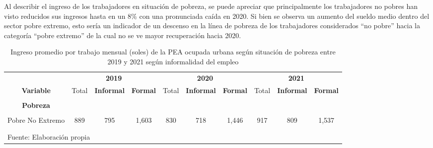 \documentclass[
  letterpaper,
  12pt,
  oneside,
  spanish,
  doublespacing,
  headsepline,
  parskip]{MastersDoctoralThesis}
\begin{document}
Al describir el ingreso de los trabajadores en situación de pobreza, se
puede apreciar que principalmente los trabajadores no pobres han visto
reducidos sus ingresos hasta en un 8\% con una pronunciada caída en
2020. Si bien se observa un aumento del sueldo medio dentro del sector
pobre extremo, esto sería un indicador de un descenso en la línea de
pobreza de los trabajadores considerados ``no pobre'' hacia la categoría
``pobre extremo'' de la cual no se ve mayor recuperación hacia 2020.

\hypertarget{tbl-ing_pobreza}{}
\begin{table}[H]
\caption{\label{tbl-ing_pobreza}Ingreso promedio por trabajo mensual (soles) de la PEA ocupada urbana
según situación de pobreza entre 2019 y 2021 según informalidad del
empleo }\tabularnewline

\centering\begingroup\fontsize{9}{11}\selectfont

\begin{tabular}{cccccccccc}
\toprule
\multicolumn{1}{c}{ } & \multicolumn{3}{c}{\textbf{2019}} & \multicolumn{3}{c}{\textbf{2020}} & \multicolumn{3}{c}{\textbf{2021}} \\
\cmidrule(l{3pt}r{3pt}){2-4} \cmidrule(l{3pt}r{3pt}){5-7} \cmidrule(l{3pt}r{3pt}){8-10}
\textbf{Variable} & Total & \textbf{Informal} & \textbf{Formal} & Total & \textbf{Informal} & \textbf{Formal} & Total & \textbf{Informal} & \textbf{Formal}\\
\midrule
\cellcolor{gray!6}{\textbf{Nacional}} & \cellcolor{gray!6}{1,595} & \cellcolor{gray!6}{1,037} & \cellcolor{gray!6}{2,599} & \cellcolor{gray!6}{1,407} & \cellcolor{gray!6}{901} & \cellcolor{gray!6}{2,380} & \cellcolor{gray!6}{1,443} & \cellcolor{gray!6}{989} & \cellcolor{gray!6}{2,473}\\
\textbf{Pobreza} &  &  &  &  &  &  &  &  & \\
\cellcolor{gray!6}{Pobre Extremo} & \cellcolor{gray!6}{555} & \cellcolor{gray!6}{551} & \cellcolor{gray!6}{815} & \cellcolor{gray!6}{550} & \cellcolor{gray!6}{526} & \cellcolor{gray!6}{864} & \cellcolor{gray!6}{682} & \cellcolor{gray!6}{646} & \cellcolor{gray!6}{1,168}\\
Pobre No Extremo & 889 & 795 & 1,603 & 830 & 718 & 1,446 & 917 & 809 & 1,537\\
\cellcolor{gray!6}{No Pobre} & \cellcolor{gray!6}{1,686} & \cellcolor{gray!6}{1,084} & \cellcolor{gray!6}{2,634} & \cellcolor{gray!6}{1,545} & \cellcolor{gray!6}{965} & \cellcolor{gray!6}{2,464} & \cellcolor{gray!6}{1,556} & \cellcolor{gray!6}{1,041} & \cellcolor{gray!6}{2,555}\\
\bottomrule
\multicolumn{10}{l}{\textsuperscript{} Fuente: Elaboración propia}\\
\end{tabular}
\endgroup{}
\end{table}
\end{document}
